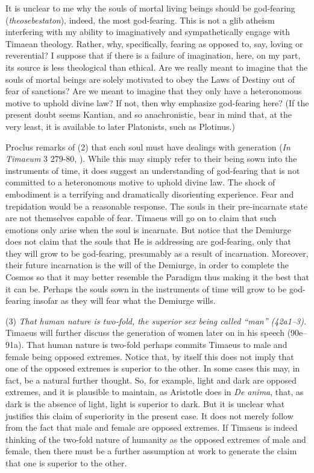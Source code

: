It is unclear to me why the souls of mortal living beings should be god-fearing (\emph{theosebestaton}), indeed, the most god-fearing. This is not a glib atheism interfering with my ability to imaginatively and sympathetically engage with Timaean theology. Rather, why, specifically, fearing as opposed to, say, loving or reverential? I suppose that if there is a failure of imagination, here, on my part, its source is less theological than ethical. Are we really meant to imagine that the souls of mortal beings are solely motivated to obey the Laws of Destiny out of fear of sanctions? Are we meant to imagine that they only have a heteronomous motive to uphold divine law? If not, then why emphasize god-fearing here? (If the present doubt seems Kantian, and so anachronistic, bear in mind that, at the very least, it is available to later Platonists, such as Plotinus.)

Proclus remarks of (2) that each soul must have dealings with generation (\emph{In Timaeum} 3 279-80, \citealt{Diehl:1903re}). While this may simply refer to their being sown into the instruments of time, it does suggest an understanding of god-fearing that is not committed to a heteronomous motive to uphold divine law. The shock of embodiment is a terrifying and dramatically disorienting experience. Fear and trepidation would be a reasonable response. The souls in their pre-incarnate state are not themselves capable of fear. Timaeus will go on to claim that such emotions only arise when the soul is incarnate. But notice that the Demiurge does not claim that the souls that He is addressing are god-fearing, only that they will grow to be god-fearing, presumably as a result of incarnation. Moreover, their future incarnation is the will of the Demiurge, in order to complete the Cosmos so that it may better resemble the Paradigm thus making it the best that it can be. Perhaps the souls sown in the instruments of time will grow to be god-fearing insofar as they will fear what the Demiurge wills.

(3) \emph{That human nature is two-fold, the superior sex being called ``man'' (42a1--3).} Timaeus will further discuss the generation of women later on in his speech (90e--91a). That human nature is two-fold perhaps commits Timaeus to male and female being opposed extremes. Notice that, by itself this does not imply that one of the opposed extremes is superior to the other. In some cases this may, in fact, be a natural further thought. So, for example, light and dark are opposed extremes, and it is plausible to maintain, as Aristotle does in \emph{De anima}, that, as dark is the absence of light, light is superior to dark. But it is unclear what justifies this claim of superiority in the present case. It does not merely follow from the fact that male and female are opposed extremes. If Timaeus is indeed thinking of the two-fold nature of humanity as the opposed extremes of male and female, then there must be a further assumption at work to generate the claim that one is superior to the other.

